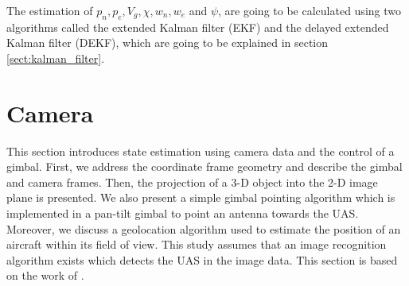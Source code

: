 The estimation of $p_n,p_e,V_g,\chi,w_n,w_e$ and $\psi$, are going to be calculated using two algorithms called the extended Kalman filter (EKF) and the 
delayed extended Kalman filter (DEKF), which are going to be explained in section \ref{sect:kalman_filter}.

\pagebreak
\section{Camera}{\label{sect:camera}}
This section introduces state estimation using camera data and the control of a gimbal. First, we address the coordinate frame geometry and describe the gimbal and camera frames. Then, the projection of a 3-D object into the 2-D image plane is presented. We also present a simple gimbal pointing algorithm which is implemented in a pan-tilt gimbal to point an antenna towards the UAS. Moreover, we discuss a geolocation algorithm used to estimate the position of an aircraft within its field of view. This study assumes that an image recognition algorithm exists which detects the UAS in the image data. This section is based on the work of \cite{Beard2010}.
